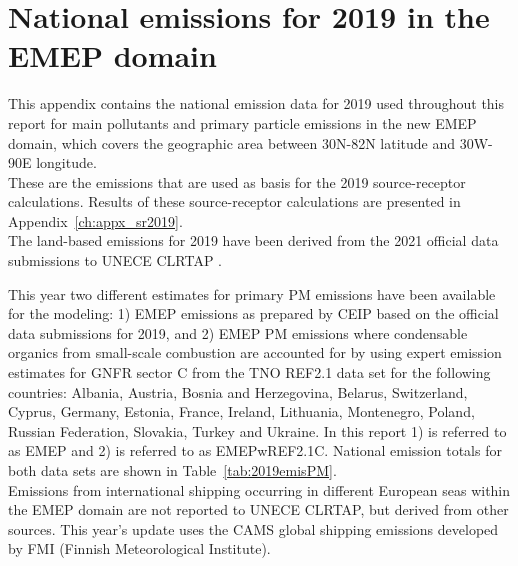 \setcounter{page}{1}

\cleardoublepage
\chapter[2019 Emissions]{National emissions for 2019 in the EMEP domain}
\label{ch:appx_emis_2019}


This appendix contains the national emission data for 2019 used throughout this
report for main pollutants and  primary particle emissions in the new 
EMEP domain, which covers the geographic area between 30\degrees N-82\degrees N latitude and 30\degrees W-90\degrees E longitude. \\

These are the emissions that are used as basis
 for the 2019 source-receptor calculations. Results of these
 source-receptor calculations are presented in Appendix~\ref{ch:appx_sr2019}.\\

The land-based emissions for 2019 have been derived from the 2021
official data submissions to UNECE CLRTAP .


This year two different estimates for primary PM emissions have been available for the modeling: 1) EMEP emissions as prepared by CEIP based on the official data submissions for 2019, and 2) EMEP PM emissions where condensable organics from small-scale combustion are accounted for by using expert emission estimates for GNFR sector C from the TNO REF2.1 data set for the following countries: Albania, Austria, Bosnia and Herzegovina, Belarus, Switzerland, Cyprus, Germany, Estonia, France,  Ireland, Lithuania, Montenegro, Poland, Russian Federation, Slovakia, Turkey and Ukraine.
In this report 1) is referred to as EMEP and 2) is referred to as EMEPwREF2.1C. National emission totals for both data sets are shown in Table~\ref{tab:2019emisPM}.  \\

Emissions from international shipping occurring in different European seas within the EMEP domain are not reported to UNECE CLRTAP, but derived from other sources. This year's update uses the CAMS global shipping emissions   developed by FMI (Finnish Meteorological Institute).
\\

